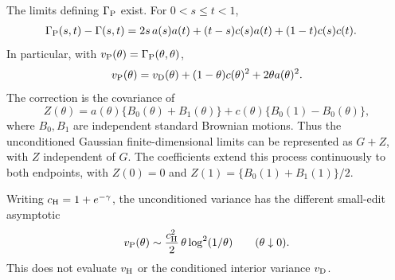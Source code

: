 \documentclass[11pt,letterpaper]{article}
\begin{document}
\begin{proposition}
\label{prop:dense-count-correction}
The limits defining $\Gamma_{\rm P}$ exist. For $0<s\le t<1$,
\begin{align}
 \Gamma_{\rm P}(s,t)-\Gamma(s,t)
   &=2s\,a(s)a(t)+(t-s)c(s)a(t)
                        +(1-t)c(s)c(t).
       \label{eq:dense-count-correction}
\end{align}
In particular, with $v_{\rm P}(\theta)=\Gamma_{\rm P}(\theta,\theta)$,
\begin{equation}\label{eq:dense-Poisson-variance}
 v_{\rm P}(\theta)
   =v_{\rm D}(\theta)+(1-\theta)c(\theta)^2
                                      +2\theta a(\theta)^2.
\end{equation}
The correction is the covariance of
\begin{equation}\label{eq:dense-count-Gaussian}
 Z(\theta)=a(\theta)\{B_0(\theta)+B_1(\theta)\}
             +c(\theta)\{B_0(1)-B_0(\theta)\},
\end{equation}
where $B_0,B_1$ are independent standard Brownian motions.
Thus the unconditioned Gaussian finite-dimensional limits
can be represented as $G+Z$, with $Z$ independent of $G$.
The coefficients extend this process continuously to both
endpoints, with $Z(0)=0$ and
$Z(1)=\{B_0(1)+B_1(1)\}/2$.

Writing $c_{\rm H}=1+e^{-\gamma}$, the unconditioned variance
has the different small-edit asymptotic
\begin{equation}\label{eq:dense-Poisson-small-variance}
 v_{\rm P}(\theta)\sim
       \frac{c_{\rm H}^2}{2}\,
             \theta\log^2(1/\theta)
                         \qquad(\theta\downarrow0).
\end{equation}
This does not evaluate $v_{\rm H}$ or the conditioned
interior variance $v_{\rm D}$.
\end{proposition}
\end{document}

